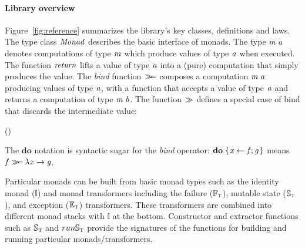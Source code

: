 \paragraph{Library overview}
Figure~\ref{fig:reference} summarizes the library's key classes, definitions
and laws. The type class \ensuremath{\Conid{Monad}} describes the basic interface of monads.  The
type \ensuremath{\Varid{m}\;\Varid{a}} denotes computations of type \ensuremath{\Varid{m}} which produce values of type \ensuremath{\Varid{a}}
when executed.  The function \ensuremath{\Varid{return}} lifts a value of type \ensuremath{\Varid{a}} into a (pure)
computation that simply produces the value. The \emph{bind} function \ensuremath{\bind }
composes a computation \ensuremath{\Varid{m}\;\Varid{a}} producing values of type \ensuremath{\Varid{a}}, with a
function that accepts a value of type \ensuremath{\Varid{a}} and returns a computation of type
\ensuremath{\Varid{m}\;\Varid{b}}. The function \ensuremath{\sequ } defines a special case of bind that discards
the intermediate value:
\begin{hscode}\SaveRestoreHook
{}%
%
%
\>[3]{}(\sequ )\mathbin{::}\;\Rightarrow {}\;\to {}\;\to {}\;\<[E]%
\\
\>[3]{}\sequ {}\mathrel{=}\bind {}\to {}\<[E]%
\ColumnHook
\end{hscode}\resethooks
The \ensuremath{\mathbf{do}} notation is syntactic sugar for the \textit{bind}
operator: \ensuremath{\mathbf{do}\;\{\mskip1.5mu \Varid{x}\leftarrow \Varid{f};\Varid{g}\mskip1.5mu\}} means \ensuremath{\Varid{f}\bind \lambda \Varid{x}\to \Varid{g}}.

Particular monads can be built from basic monad types such as the
identity monad (\ensuremath{\mathbb{I}}) and monad transformers including the
failure (\ensuremath{\mathbb{F}_{\scalebox{0.6}{T}}}), mutable state (\ensuremath{\mathbb{S}_{\scalebox{0.6}{T}}}), and exception (\ensuremath{\mathbb{E}_{\scalebox{0.6}{T}}})
transformers. These transformers are combined into different monad
stacks with \ensuremath{\mathbb{I}} at the bottom. Constructor and extractor
functions such as \ensuremath{\mathbb{S}_{\scalebox{0.6}{T}}} and \ensuremath{run\mathbb{S}_{\scalebox{0.6}{T}}} provide the signatures of
the functions for building and running particular
monads/transformers.

